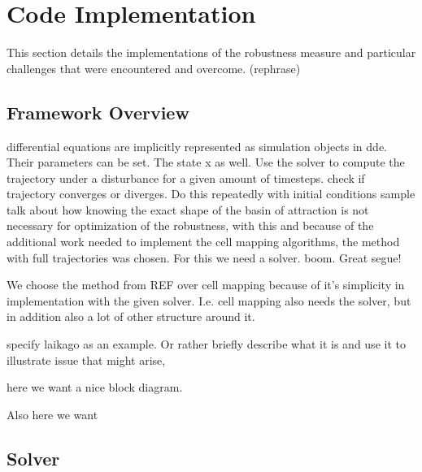     


\section{Code Implementation}

This section details the implementations of the robustness measure and particular challenges that were encountered and overcome. (rephrase)

\subsection{Framework Overview}

differential equations are implicitly represented as simulation objects in dde. Their parameters can be set. The state x as well. Use the solver to compute the trajectory under a disturbance for a given amount of timesteps. check if trajectory converges or diverges. Do this repeatedly with initial conditions sample
talk about how knowing the exact shape of the basin of attraction is not necessary for optimization of the robustness, with this and because of the additional work needed to implement the cell mapping algorithms, the method with full trajectories was chosen. For this we need a solver. boom. Great segue!

We choose the method from REF over cell mapping because of it's simplicity in implementation with the given solver. 
I.e. cell mapping also needs the solver, but in addition also a lot of other structure around it. 

specify laikago as an example. Or rather briefly describe what it is and use it to illustrate issue that might arise, 

here we want a nice block diagram. 

Also here we want

\subsection{Solver}

